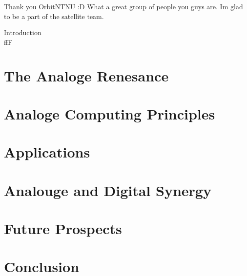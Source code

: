 \documentclass{report}
\begin{document}
Thank you OrbitNTNU :D What a great group of people you guys are. Im glad to be a part of the satellite team. \lipsum[1]

\newpage
\Large{Introduction}\\
\lipsum[1-2]ffF

\chapter{The Analoge Renesance}


\chapter{Analoge Computing Principles}


\chapter{Applications}


\chapter{Analouge and Digital Synergy}


\chapter{Future Prospects}


\chapter{Conclusion}



\newpage
{}
\end{document}
